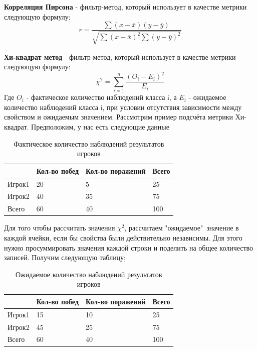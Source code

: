 \textbf{Корреляция Пирсона} - фильтр-метод, который использует в качестве метрики следующую формулу:
\begin{equation}
\label{pearson}
r=\frac{\sum(x - \overline{x})(y - \overline{y})}{\sqrt{\sum(x - \overline{x})^2\sum(y - \overline{y})^2}}
\end{equation}

\textbf{Хи-квадрат метод} - фильтр-метод, который использует в качестве метрики следующую формулу:
\begin{equation}
\label{chi2}
\chi^2=\sum_{i=1}^n\frac{(O_i - E_i)^2}{E_i}
\end{equation}
Где $O_i$ - фактическое количество наблюдений класса i, а $E_i$ - ожидаемое количество наблюдений класса i, при условии отсутствия зависимости между свойством и ожидаемым значением.
Рассмотрим пример подсчёта метрики Хи-квадрат.
Предположим, у нас есть следующие данные
\begin{table}[!h]
	
	\caption{\label{tab:table1}Фактическое количество наблюдений результатов игроков}
	
	\begin{center}
\begin{tabular}{|l|l|l|l|}

\hline

  & Кол-во побед & Кол-во поражений & Всего \\
\hline
Игрок1  & 20 & 5 & 25 \\
\hline
Игрок2  & 40 & 35 & 75 \\
\hline
Всего  & 60 & 40 & 100 \\
\hline

\end{tabular}
		
\end{center}

\end{table}

Для того чтобы рассчитать значения $\chi^2$, рассчитаем "ожидаемое"\ значение в каждой ячейки, если бы свойства были действительно независимы. Для этого нужно просуммировать значения каждой строки и поделить на общее количество записей.
Получим следующую таблицу;
\begin{table}[!h]
	
	\caption{\label{tab:table2}Ожидаемое количество наблюдений результатов игроков}
	
	\begin{center}
\begin{tabular}{|l|l|l|l|}

\hline

  & Кол-во побед & Кол-во поражений & Всего \\
\hline
Игрок1  & 15 & 10 & 25 \\
\hline
Игрок2  & 45 & 25 & 75 \\
\hline
Всего  & 60 & 40 & 100 \\
\hline

\end{tabular}
		
\end{center}

\end{table}

